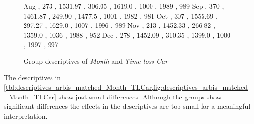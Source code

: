 \begin{figure}[ht!]
\begin{minipage}{0.55\textwidth}
{			Aug , 273 , 1531.97 , 306.05 , 1619.0 , 1000 , 1989 , 989
			Sep , 370 , 1461.87 , 249.90 , 1477.5 , 1001 , 1982 , 981 
			Oct , 307 , 1555.69 , 297.27 , 1629.0 , 1007 , 1996 , 989
			Nov , 213 , 1452.33 , 266.82 , 1359.0 , 1036 , 1988 , 952 
			Dec , 278 , 1452.09 , 310.35 , 1399.0 , 1000 , 1997 , 997 
		}\data
		\pgfplotstablesort[sort key=mean, sort cmp=float >]{\datasorted}{\data}
		\tiny
		\centering
		\label{fig:descriptives_arbis_matched_Month_TLCar}
	\end{minipage}%
	\caption{Group descriptives of \textit{Month} and \textit{Time-loss Car}}
\end{figure}
The descriptives in \cref{tbl:descriptives_arbis_matched_Month_TLCar,fig:descriptives_arbis_matched_Month_TLCar} show just small differences. Although the groups show significant differences the effects in the descriptives are too small for a meaningful interpretation.
